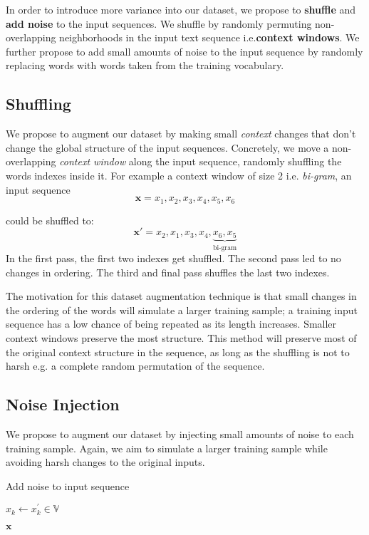 In order to introduce more variance into our dataset, we propose to \textbf{shuffle} and \textbf{add noise} to the input sequences.
We shuffle by randomly permuting non-overlapping neighborhoods in the input text sequence i.e.\textbf{context windows}.
We further propose to add small amounts of
noise to the input sequence by randomly replacing words with words taken from the training vocabulary.

\subsection{Shuffling}
We propose to augment our dataset by making small \textit{context} changes that don't change the global structure
of the input sequences. Concretely, we move a non-overlapping \textit{context window} along the input sequence, randomly
shuffling the words indexes inside it. For example a context window of size 2 i.e. \textit{bi-gram}, an input sequence
\[\bm{x} = x_1, x_2, x_3, x_4, x_5, x_6\]

 could be shuffled to:
\[\bm{x}\prime = x_2, x_1, x_3, x_4, \underbrace{x_6, x_5}_\text{bi-gram}\]
In the first pass, the first two indexes get shuffled. The second pass led to no changes in ordering. The third and
final pass shuffles the last two indexes.

The motivation for this dataset augmentation technique is that small changes in the ordering of the words will
simulate a larger training sample; a training input sequence has a low chance of being repeated as its
length increases. Smaller context windows preserve the most structure. This method will preserve
most of the original context structure in the sequence, as long as the shuffling is not to harsh e.g.
a complete random permutation of the sequence.

\subsection{Noise Injection}
We propose to augment our dataset by injecting small amounts of noise to each training sample. Again, we aim to simulate
a larger training sample while avoiding harsh changes to the original inputs.
\begin{algorithm}[H]
\caption{Add noise to input sequence}
\begin{algorithmic}[1]
\State$x_k \gets x^{\prime}_k \in \mathbb{V}$
\EndIf
\EndFor

\Return $\bm{x}$
\EndProcedure
\end{algorithmic}
\end{algorithm}


